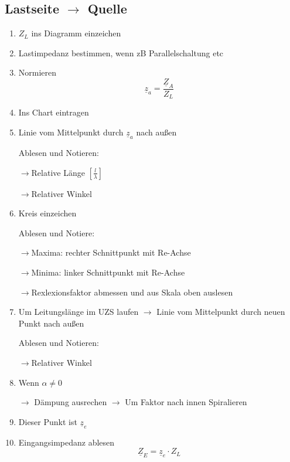 \subsection[Von Last zu Quelle]{Lastseite $\rightarrow$ Quelle}
\begin{enumerate}
    \item $Z_L$ ins Diagramm einzeichen
    \item Lastimpedanz bestimmen,
          wenn zB Parallelschaltung etc
    \item Normieren
          \[\underline{z}_a = \frac{\underline{Z}_A}{Z_L} \]
    \item Ins Chart eintragen
    \item Linie vom Mittelpunkt durch $\underline{z}_a$ nach außen

          Ablesen und Notieren:

          $\rightarrow$Relative Länge $\left[\frac{l}{\lambda}\right]$

          $\rightarrow$Relativer Winkel
    \item Kreis einzeichen

          Ablesen und Notiere:

          $\rightarrow$Maxima: rechter Schnittpunkt mit Re-Achse

          $\rightarrow$Minima: linker  Schnittpunkt mit Re-Achse

          $\rightarrow$Rexlexionsfaktor abmessen und aus Skala oben auslesen
    \item Um Leitungslänge im UZS laufen
          $\rightarrow$ Linie vom Mittelpunkt durch neuen Punkt nach außen

          Ablesen und Notieren:

          $\rightarrow$Relativer Winkel
    \item Wenn $\alpha\neq 0$

          $\rightarrow$ Dämpung ausrechen
          $\rightarrow$ Um Faktor nach innen Spiralieren

    \item Dieser Punkt ist $\underline{z}_e$
    \item Eingangsimpedanz ablesen
          \[\underline{Z}_E = \underline{z}_e \cdot Z_L\]
\end{enumerate}

